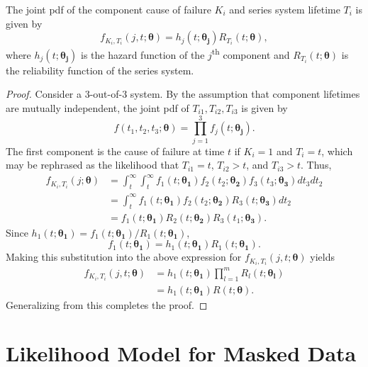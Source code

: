 \documentclass[
]{article}
\begin{document}
\begin{theorem}
\label{thm:f_k_and_t}
The joint pdf of the component cause of failure $K_i$ and series system lifetime
$T_i$ is given by
\begin{equation}
\label{eq:f_k_and_t}
  f_{K_i,T_i}(j,t;\boldsymbol{\theta}) = h_j(t;\boldsymbol{\theta_j}) R_{T_i}(t;\boldsymbol{\theta}),
\end{equation}
where $h_j(t;\boldsymbol{\theta_j})$ is the hazard function of the $j$\textsuperscript{th}
component and $R_{T_i}(t;\boldsymbol{\theta})$ is the reliability function of the series
system.
\end{theorem}
\begin{proof}
Consider a $3$-out-of-$3$ system.
By the assumption that component lifetimes are mutually independent,
the joint pdf of $T_{i 1},T_{i 2},T_{i 3}$ is given by
$$
    f(t_1,t_2,t_3;\boldsymbol{\theta}) = \prod_{j=1}^{3} f_j(t;\boldsymbol{\theta_j}).
$$
The first component is the cause of failure at time $t$ if $K_i = 1$ and
$T_i = t$, which may be rephrased as the likelihood that $T_{i 1} = t$,
$T_{i 2} > t$, and $T_{i 3} > t$. Thus,
\begin{align*}
f_{K_i,T_i}(j;\boldsymbol{\theta}) 
    &= \int_t^{\infty} \int_t^{\infty}
        f_1(t;\boldsymbol{\theta_1}) f_2(t_2;\boldsymbol{\theta_2}) f_3(t_3;\boldsymbol{\theta_3})
        dt_3 dt_2\\
     &= \int_t^{\infty} f_1(t;\boldsymbol{\theta_1}) f_2(t_2;\boldsymbol{\theta_2})
        R_3(t;\boldsymbol{\theta_3}) dt_2\\
     &= f_1(t;\boldsymbol{\theta_1}) R_2(t;\boldsymbol{\theta_2}) R_3(t_1;\boldsymbol{\theta_3}).
\end{align*}
Since $h_1(t;\boldsymbol{\theta_1}) = f_1(t;\boldsymbol{\theta_1}) / R_1(t;\boldsymbol{\theta_1})$,
$$
f_1(t;\boldsymbol{\theta_1}) = h_1(t;\boldsymbol{\theta_1}) R_1(t;\boldsymbol{\theta_1}).
$$
Making this substitution into the above expression for $f_{K_i,T_i}(j,t;\boldsymbol{\theta})$
yields
\begin{align*}
f_{K_i,T_i}(j,t;\boldsymbol{\theta})
    &= h_1(t;\boldsymbol{\theta_1}) \prod_{l=1}^m R_l(t;\boldsymbol{\theta_l})\\
    &= h_1(t;\boldsymbol{\theta_1}) R(t;\boldsymbol{\theta}).
\end{align*}
Generalizing from this completes the proof.
\end{proof}

\hypertarget{sec:like_model}{%
\section{Likelihood Model for Masked Data}\label{sec:like_model}}
\end{document}
